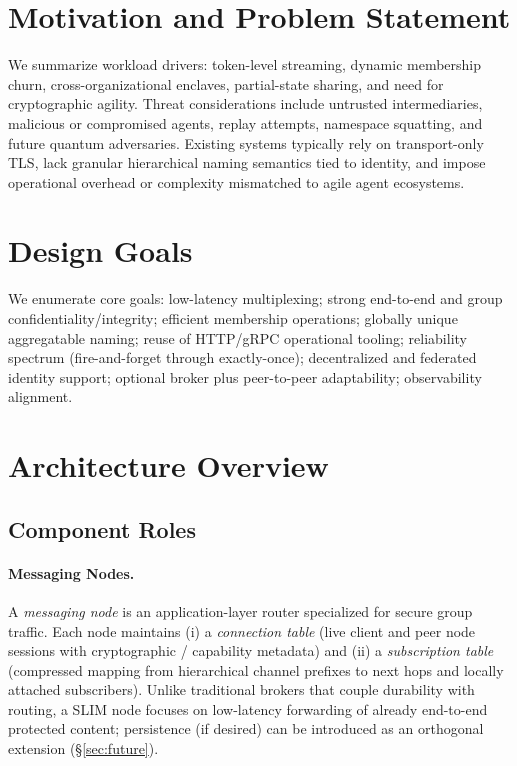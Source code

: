 \documentclass{article}
\theoremstyle{definition}
\theoremstyle{remark}
\begin{document}
\section{Motivation and Problem Statement}\label{sec:motivation}
We summarize workload drivers: token-level streaming, dynamic membership churn, cross-organizational enclaves, partial-state sharing, and need for cryptographic agility. Threat considerations include untrusted intermediaries, malicious or compromised agents, replay attempts, namespace squatting, and future quantum adversaries. Existing systems typically rely on transport-only TLS, lack granular hierarchical naming semantics tied to identity, and impose operational overhead or complexity mismatched to agile agent ecosystems.

\section{Design Goals}\label{sec:goals}
We enumerate core goals: low-latency multiplexing; strong end-to-end and group confidentiality/integrity; efficient membership operations; globally unique aggregatable naming; reuse of HTTP/gRPC operational tooling; reliability spectrum (fire-and-forget through exactly-once); decentralized and federated identity support; optional broker plus peer-to-peer adaptability; observability alignment.

\section{Architecture Overview}\label{sec:architecture}
\subsection{Component Roles}
\paragraph{Messaging Nodes.} A \emph{messaging node} is an application-layer router specialized for secure group traffic. Each node maintains (i) a \emph{connection table} (live client and peer node sessions with cryptographic / capability metadata) and (ii) a \emph{subscription table} (compressed mapping from hierarchical channel prefixes to next hops and locally attached subscribers). Unlike traditional brokers that couple durability with routing, a SLIM node focuses on low-latency forwarding of already end-to-end protected content; persistence (if desired) can be introduced as an orthogonal extension (\S\ref{sec:future}).
\end{document}
